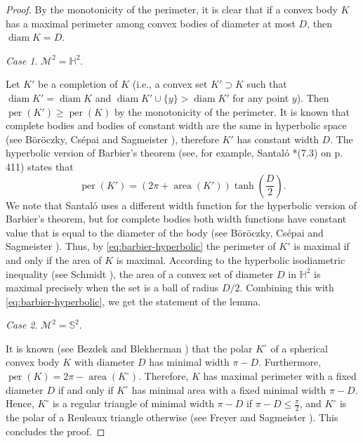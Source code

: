 \documentclass[12pt,reqno]{amsart}
\theoremstyle{remark}
\newtheorem{case}{Case}
\newcommand{\hyp}{{\mathbb H}}
\newcommand{\sph}{{\mathbb S}}
\newcommand{\M}{\mathcal{M}}
\DeclareMathOperator{\diam}{\mathrm{diam}}
\DeclareMathOperator{\per}{per}
\DeclareMathOperator{\area}{\mathrm{area}}
\begin{document}
\begin{proof}
By the monotonicity of the perimeter, it is clear that if a convex body $K$ has a maximal perimeter among convex bodies of diameter at most $D$, then $\diam K=D$.

\setcounter{case}{0}
\begin{case}
$\M^2=\hyp^2$.
\end{case}

Let $K'$ be a completion of $K$ (i.e., a convex set $K'\supset K$ such that $\diam K'=\diam K$ and $\diam K'\cup\{y\}>\diam K'$ for any point $y$). Then $\per (K')\geq\per (K)$ by the monotonicity of the perimeter. 
It is known that complete bodies and bodies of constant width are the same in hyperbolic space (see B\"or\"oczky, Cs\'epai and Sagmeister \cite{BoCsS}), therefore $K'$ has constant width $D$. The hyperbolic version of Barbier's theorem (see, for example, Santal\'o \cite{S45}*{(7.3) on p. 411)} states that
\begin{equation}\label{eq:barbier-hyperbolic}
    \per (K')=(2\pi+\area (K'))\tanh \left (\frac D2\right ).
\end{equation}
We note that Santal\'o \cite{S45} uses a different width function for the hyperbolic version of Barbier's theorem, but for complete bodies both width functions have constant value that is equal to the diameter of the body (see B\"or\"oczky, Cs\'epai and Sagmeister \cite{BoCsS}). Thus, by \eqref{eq:barbier-hyperbolic} the perimeter of $K'$ is maximal if and only if the area of $K$ is maximal. 
According to the hyperbolic isodiametric inequality (see Schmidt \cites{Sch48,Sch49}), the  area of a convex set of diameter $D$ in $\hyp^2$ is maximal precisely when the set is a ball of radius $D/2$. Combining this with \eqref{eq:barbier-hyperbolic}, we get the statement of the lemma. 

\begin{case}
$\M^2=\sph^2$.
\end{case}

It is known (see Bezdek and Blekherman \cite{Bez00}) that the polar $K^\circ$ of a spherical convex body $K$ with diameter $D$ has minimal width $\pi-D$. Furthermore, $\per (K)=2\pi-\area (K^\circ)$. Therefore, $K$ has maximal perimeter with a fixed diameter $D$ if and only if $K^\circ$ has minimal area with a fixed minimal width $\pi-D$. Hence, $K^\circ$ is a regular triangle of minimal width $\pi-D$ if $\pi-D\leq\frac{\pi}{2}$, and $K^\circ$ is the polar of a Reuleaux triangle otherwise (see Freyer and Sagmeister \cite{FS}). This concludes the proof.
\end{proof}
\end{document}
